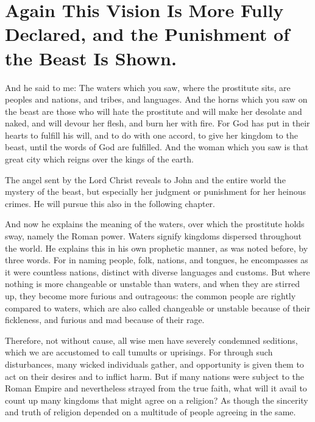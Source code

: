 \chapter[Sermon 76. Again This Vision Is More Fully Declared, and the Punishment of the Beast Is Shown.]{Again This Vision Is More Fully Declared, and the Punishment of the Beast Is Shown.}
\label{sermon:076}

And he said to me: The waters which you saw, where the prostitute sits, are peoples and nations, and tribes, and languages. And the horns which you saw on the beast are those who will hate the prostitute and will make her desolate and naked, and will devour her flesh, and burn her with fire. For God has put in their hearts to fulfill his will, and to do with one accord, to give her kingdom to the beast, until the words of God are fulfilled. And the woman which you saw is that great city which reigns over the kings of the earth.

The angel sent by the Lord Christ reveals to John and the entire world the mystery of the beast, but especially her judgment or punishment for her heinous crimes. He will pursue this also in the following chapter.

And now he explains the meaning of the waters, over which the prostitute holds sway, namely the Roman power. Waters signify kingdoms dispersed throughout the world. He explains this in his own prophetic manner, as was noted before, by three words. For in naming people, folk, nations, and tongues, he encompasses as it were countless nations, distinct with diverse languages and customs. But where nothing is more changeable or unstable than waters, and when they are stirred up, they become more furious and outrageous: the common people are rightly compared to waters, which are also called changeable or unstable because of their fickleness, and furious and mad because of their rage.

Therefore, not without cause, all wise men have severely condemned seditions, which we are accustomed to call tumults or uprisings. For through such disturbances, many wicked individuals gather, and opportunity is given them to act on their desires and to inflict harm. But if many nations were subject to the Roman Empire and nevertheless strayed from the true faith, what will it avail to count up many kingdoms that might agree on a religion? As though the sincerity and truth of religion depended on a multitude of people agreeing in the same.

